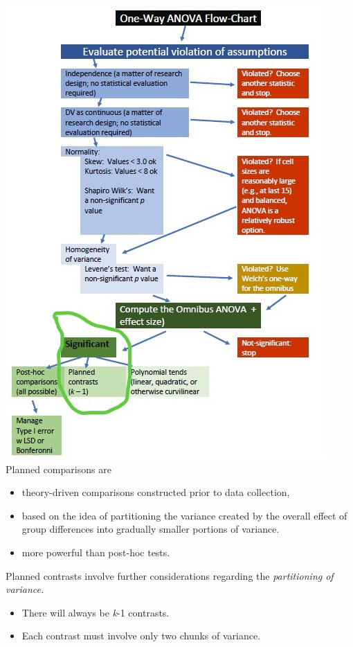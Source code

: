 \documentclass[
  english,
]{book}
\providecommand{\tightlist}{%
  \setlength{\itemsep}{0pt}\setlength{\parskip}{0pt}}
\begin{document}
\includegraphics{images/OnewayWrkFlw_planned.jpg}
Planned comparisons are

\begin{itemize}
\tightlist
\item
  theory-driven comparisons constructed prior to data collection,
\item
  based on the idea of partitioning the variance created by the overall effect of group differences into gradually smaller portions of variance.
\item
  more powerful than post-hoc tests.
\end{itemize}

Planned contrasts involve further considerations regarding the \emph{partitioning of variance.}

\begin{itemize}
\tightlist
\item
  There will always be \emph{k}-1 contrasts.
\item
  Each contrast must involve only two chunks of variance.
\end{itemize}
\end{document}
